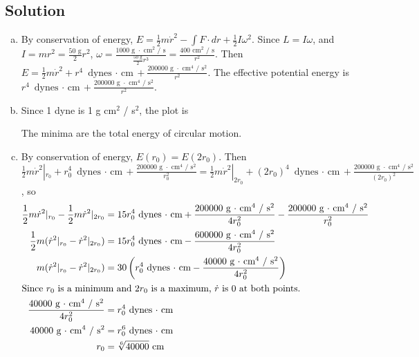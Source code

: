 \documentclass[solutions]{esg8012pset}
\begin{document}
\subsection{Solution}
\begin{enumerate}[(a)]
  \item By conservation of energy, $E = \frac{1}{2} m \dot r^2 - \int F\cdot d r + \frac{1}{2}I\omega^2$.  Since $L = I\omega$, and $I = m r^2 = \frac{50\text{ g}}{2}r^2$, $\omega = \frac{1000\text{ g $\cdot$ cm$^2$ / s}}{\frac{50\text{ g}}{2}r^3} = \frac{400\text{ cm$^2$ / s}}{r^2}$.  Then $E = \frac{1}{2}m\dot r^2 + r^4\text{ dynes $\cdot$ cm} + \frac{200000\text{ g $\cdot$ cm$^4$ / s$^2$}}{r^2}$.  The effective potential energy is $r^4\text{ dynes $\cdot$ cm} + \frac{200000\text{ g $\cdot$ cm$^4$ / s$^2$}}{r^2}$.
  \item Since 1 dyne is 1 g cm$^2$ / s$^2$, the plot is \par
{} \par The minima are the total energy of circular motion.
  \item By conservation of energy, $E(r_0) = E(2r_0)$.  Then $\frac{1}{2}m\dot r^2|_{r_0} + r_0^4\text{ dynes $\cdot$ cm} + \frac{200000\text{ g $\cdot$ cm$^4$ / s$^2$}}{r_0^2} = \frac{1}{2}m\dot r^2|_{2r_0} + (2r_0)^4\text{ dynes $\cdot$ cm} + \frac{200000\text{ g $\cdot$ cm$^4$ / s$^2$}}{(2r_0)^2}$, so \begin{align*}
  \frac{1}{2}m\dot r^2|_{r_0} - \frac{1}{2}m\dot r^2|_{2r_0} & =  15r_0^4\text{ dynes $\cdot$ cm} + \frac{200000\text{ g $\cdot$ cm$^4$ / s$^2$}}{4r_0^2} - \frac{200000\text{ g $\cdot$ cm$^4$ / s$^2$}}{r_0^2} \\
  \frac{1}{2}m(\dot r^2|_{r_0} - \dot r^2|_{2r_0}) & =  15r_0^4\text{ dynes $\cdot$ cm} - \frac{600000\text{ g $\cdot$ cm$^4$ / s$^2$}}{4r_0^2} \\
  m(\dot r^2|_{r_0} - \dot r^2|_{2r_0}) & =  30\left(r_0^4\text{ dynes $\cdot$ cm} - \frac{40000\text{ g $\cdot$ cm$^4$ / s$^2$}}{4r_0^2}\right) \\
  \intertext{Since $r_0$ is a minimum and $2r_0$ is a maximum, $\dot r$ is 0 at both points.}
  \frac{40000\text{ g $\cdot$ cm$^4$ / s$^2$}}{4r_0^2} & =  r_0^4\text{ dynes $\cdot$ cm} \\
  40000\text{ g $\cdot$ cm$^4$ / s$^2$} & =  r_0^6\text{ dynes $\cdot$ cm} \\
  r_0 & = \sqrt[6]{40000}\text{ cm}
  \end{align*}
\end{enumerate}
\end{document}
